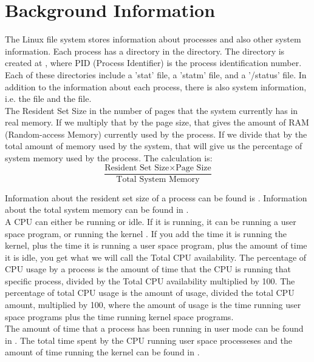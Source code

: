 \documentclass[12pt]{article}
\begin{document}
	\section{Background Information}
	The Linux  file system stores information about processes and also other system information.
Each process has a directory in the  directory\cite[p. 792]{text}.
The directory is created at , where PID (Process Identifier) is the process identification number. Each of these directories include a 'stat' file, a 'statm' file, and a '/status' file. In addition to the information about each process, there is also system information, i.e. the  file and the  file.\\
	The Resident Set Size in the number of pages that the system currently has in real memory.
	If we multiply that by the page size, that gives the amount of RAM (Random-access Memory) currently used by the process.
	If we divide that by the total amount of memory used by the system, that will give us the percentage of system memory used by the process.
	The calculation is:\\
	
	$$ \frac{\text{Resident Set Size} \times \text{Page Size}}{\text{Total System Memory}} $$
	
	Information about the resident set size of a process can be found is  \cite{manProc}.
	Information about the total system memory can be found in  \cite{manProc}.\\

A CPU can either be running or idle.
If it is running, it can be running a user space program, or running the kernel \cite{scoutBlog}.
If you add the time it is running the kernel, plus the time it is running a user space program, plus the amount of time it is idle, you get what we will call the Total CPU availability.
The percentage of CPU usage by a process is the amount of time that the CPU is running that specific process, divided by the Total CPU availability multiplied by 100.
The percentage of total CPU usage is the amount of usage, divided the total CPU amount, multiplied by 100, where the amount of usage is the time running user space programs plus the time running kernel space programs.\\
The amount of time that a process has been running in user mode can be found in . \cite{manProc}
The total time spent by the CPU running user space processeses and the amount of time running the kernel can be found in  \cite{manProc}.\\
	
\end{document}
